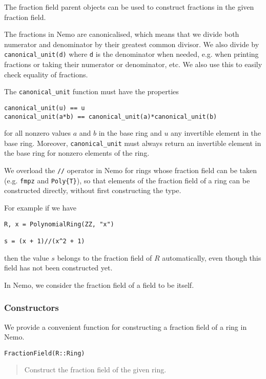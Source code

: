 \documentclass[a4paper,10pt]{article}
\newcommand{\code}{\lstinline}
\newcommand{\desc}[1]{\vspace{-3mm}\begin{quote}#1\end{quote}}
\begin{document}
The fraction field parent objects can be used to construct fractions in the
given fraction field.

The fractions in Nemo are canonicalised, which means that we divide both
numerator and denominator by their greatest common divisor. We also divide
by \code{canonical_unit(d)} where \code{d} is the denominator when needed,
e.g. when printing fractions or taking their numerator or denominator, etc.
We also use this to easily check equality of fractions.

The \code{canonical_unit} function must have the properties

\begin{lstlisting}
canonical_unit(u) == u
canonical_unit(a*b) == canonical_unit(a)*canonical_unit(b)
\end{lstlisting}

for all nonzero values $a$ and $b$ in the base ring and $u$ any invertible element
in the base ring. Moreover, \code{canonical_unit} must always return an invertible
element in the base ring for nonzero elements of the ring.

We overload the \code{//} operator in Nemo for rings whose fraction field can
be taken (e.g. \code{fmpz} and \code|Poly{T}|), so that elements of the
fraction field of a ring can be constructed directly, without first
constructing the type.

For example if we have

\begin{lstlisting}
R, x = PolynomialRing(ZZ, "x")

s = (x + 1)//(x^2 + 1)
\end{lstlisting}

then the value $s$ belongs to the fraction field of $R$ automatically, even
though this field has not been constructed yet.

In Nemo, we consider the fraction field of a field to be itself.

\subsubsection{Constructors}

We provide a convenient function for constructing a fraction field of a ring in
Nemo.

\begin{lstlisting}
FractionField(R::Ring)
\end{lstlisting}

\desc{Construct the fraction field of the given ring.}
\end{document}
